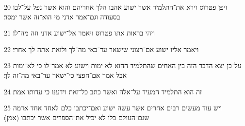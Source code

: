 \par 20 ויפן פטרוס וירא את־התלמיד אשר ישוע אהבו הלך אחריהם והוא אשר נפל על־לבו בסעודה וגם־אמר אדני מי הוא־זה אשר ימסר׃
\par 21 ויהי בראות אתו פטרוס ויאמר אל־ישוע אדני וזה מה־לו׃
\par 22 ויאמר אליו ישוע אם־רצוני שישאר עד־באי מה־לך ולזאת אתה לך אחרי׃
\par 23 על־כן יצא הדבר הזה בין האחים שהתלמיד ההוא לא ימות וישוע לא אמר־לו כי לא־ימות אבל אמר אם־חפצי כי־ישאר עד־באי מה־זה לך׃
\par 24 זה הוא התלמיד המעיד על־אלה ואשר כתב כל־זאת וידענו כי עדותו אמת׃
\par 25 ויש עוד מעשים רבים אחרים אשר עשה ישוע ואם־יכתבו כלם לאחד אחד אדמה שגם־העולם כלו לא יכיל את־הספרים אשר יכתבו (אמן)׃


